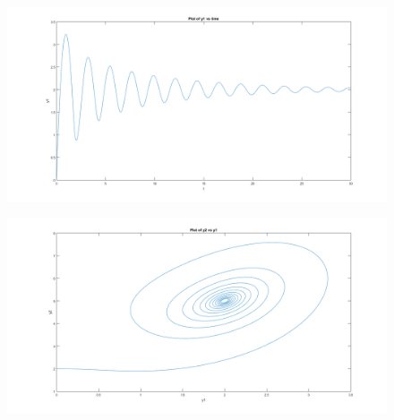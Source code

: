 \documentclass[11pt]{article}
\begin{document}
\begin{enumerate}
\begin{enumerate}
		\begin{figure}[H]
		\centering
		\includegraphics[width=\textwidth]{8b1.png}
		\end{figure}

		\medskip

		\begin{figure}[H]
		\centering
		\includegraphics[width=\textwidth]{8b3.png}
		\end{figure}

	\end{enumerate}

\end{enumerate}
\end{document}
